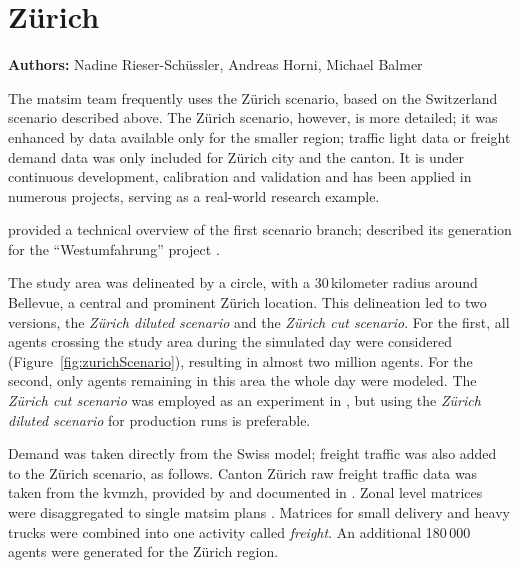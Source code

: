 \chapter{Zürich}
\label{ch:zhscenario}
\hfill \textbf{Authors:} Nadine Rieser-Schüssler, Andreas Horni, Michael Balmer


The \gls{matsim} team frequently uses the Zürich scenario, based on the Switzerland scenario described above. The Zürich scenario, however, is more detailed; it was enhanced by data available only for the smaller region; \eg traffic light data or freight demand data was only included for Zürich city and the canton. It is under continuous development, calibration and validation and has been applied in numerous projects, serving as a real-world research example.   

\citet{HorniEtAl_TechRep_IVT_2011_a} provided a technical overview of the first scenario branch; \citet[][]{BalmerEtAl_ResRep_bdktzrh_2009} described its generation for the ``Westumfahrung'' project . 

The study area was delineated by a circle, with a 30\,kilometer radius around Bellevue, a central and prominent Zürich location. This delineation led to two versions,  the \emph{Zürich diluted scenario} and the \emph{Zürich cut scenario}. For the first, all agents crossing the study area during the simulated day were considered (Figure~\ref{fig:zurichScenario}), resulting in almost two million agents. For the second, only agents remaining in this area the whole day were modeled. The \emph{Zürich cut scenario} was employed as an experiment in \citet[][]{Hackney_PhDThesis_2009}, but using the \emph{Zürich diluted scenario} for production runs is preferable.

Demand was taken directly from the Swiss model; freight traffic was also added to the Zürich scenario, as follows. Canton Zürich raw freight traffic data was taken from the \gls{kvmzh}, provided by \citet{AMV_Webpage_2011} and documented in \citet[][]{GottardiBuergler_SV_1999}. Zonal level matrices were disaggregated to single \gls{matsim} plans \citep[][]{ShahM_TechRep_IVT_2010}. Matrices for small delivery and heavy trucks were combined into one activity called \emph{freight}. An additional 180\,000 agents were generated for the Zürich region.

